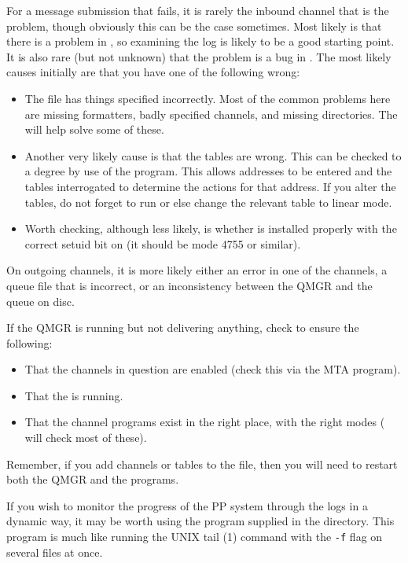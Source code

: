 For a message submission that fails, it is rarely the inbound channel
that is the problem, though obviously this can be the case sometimes.
Most likely is that there is a problem in , so examining
the  log is likely to be a good starting point. It is
also rare (but not unknown) that the problem is a bug in . The
most likely causes initially are that you have one of the following
wrong:
\begin{itemize}
\item	The  file has things specified incorrectly. Most of the
common problems here are missing formatters, badly specified channels,
and missing directories. The  will help solve some of these.

\item	Another very likely cause is that the tables are wrong. This
can be checked to a degree by use of the  program. This
allows addresses to be entered and the tables interrogated to determine
the actions for that address. If you alter the tables, do not forget to
run  or else change the relevant table to linear mode.

\item	Worth checking, although less likely, is whether  is installed
properly with the correct setuid bit on (it should be mode 4755 or similar).
\end{itemize}

On outgoing channels, it is more likely either an error in one of the
channels, a queue file that is incorrect, or an inconsistency between
the QMGR and the queue on disc.

If the QMGR is running but not delivering anything, check to 
ensure the following:
\begin{itemize}
\item	That the channels in question are enabled (check this via the MTA
 program).
\item	That the  is running.
\item	That the channel programs exist in the right place, with the
right modes ( will check most of these).
\end{itemize}
Remember, if you add channels or tables to the  file,
then you will need to restart both the QMGR and the
 programs.


If you wish to monitor the progress of the PP system through the logs
in a dynamic way, it may be worth using the  program
supplied in the  directory. This program is much like
running the UNIX \man tail (1) command with the \verb|-f| flag on
several files at once.

